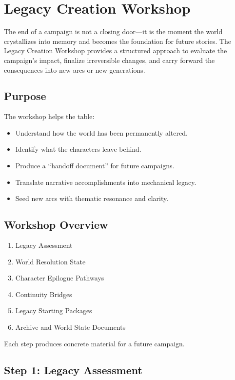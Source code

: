 \documentclass[11pt]{article}
\begin{document}
\section{Legacy Creation Workshop}
\label{sec:legacy-creation}

The end of a campaign is not a closing door---it is the moment the world crystallizes into 
memory and becomes the foundation for future stories. The Legacy Creation Workshop provides 
a structured approach to evaluate the campaign's impact, finalize irreversible changes, and 
carry forward the consequences into new arcs or new generations.

\subsection{Purpose}

The workshop helps the table:
\begin{itemize}
    \item Understand how the world has been permanently altered.
    \item Identify what the characters leave behind.
    \item Produce a ``handoff document'' for future campaigns.
    \item Translate narrative accomplishments into mechanical legacy.
    \item Seed new arcs with thematic resonance and clarity.
\end{itemize}

\subsection{Workshop Overview}

\begin{enumerate}
    \item Legacy Assessment
    \item World Resolution State
    \item Character Epilogue Pathways
    \item Continuity Bridges
    \item Legacy Starting Packages
    \item Archive and World State Documents
\end{enumerate}

Each step produces concrete material for a future campaign.

\subsection{Step 1: Legacy Assessment}
\end{document}
